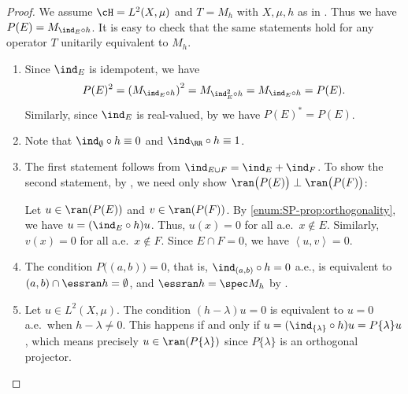 \documentclass[oneside,reqno,letterpaper]{amsart}
\begin{document}
\begin{proof}
  We assume \(\cH = L^2(X, \mu)\) and \(T = M_h\) with \(X, \mu, h\) as in . 
  Thus we have \(P(E) = M_{\ind_{E} \circ h}\). 
  It is easy to check that the same statements hold for any operator \(T\) unitarily equivalent to \(M_{h}\). 
  \begin{enumerate}[label=(\alph*)]
  \item %
    Since \(\ind_{E}\) is idempotent, we have 
    \[
      P(E)^2
      = \left( M_{\ind_{E} \circ h} \right)^2
      = M_{\ind_{E}^2 \circ h}
      = M_{\ind_{E} \circ h}
      = P(E) . 
    \] 
    Similarly, since \(\ind_{E}\) is real-valued, by  we have \(P(E)^* = P(E)\). 

  \item %
    Note that \(\ind_{\emptyset} \circ h \equiv 0\) and \(\ind_{\RR} \circ h \equiv 1\). 

  \item %
    The first statement follows from \(\ind_{E \cup F} = \ind_{E} + \ind_{F}\). 
    To show the second statement, by , we need only show \(\ran\big(P(E)\big) \perp \ran\big(P(F)\big)\):

    Let \(u \in \ran(P(E))\) and \(v \in \ran(P(F))\). 
    By \ref{enum:SP-prop:orthogonality}, we have \(u = (\ind_{E} \circ h) u\). 
    Thus, \(u(x) = 0\) for all  a.e.\ \(x \not\in E\). 
    Similarly, \(v(x) = 0\) for all a.e.\ \(x \not\in F\). 
    Since \(E \cap F = 0\), we have  \(\left< u, v \right> = 0\). 

  \item %
    The condition \(P\big((a, b)\big) = 0\), that is, \(\ind_{(a, b)} \circ h = 0\) a.e., is equivalent to \((a, b) \cap \essran h = \emptyset\), and \(\essran h = \spec M_{h}\) by . 

  \item %
    Let \(u \in L^2(X, \mu)\). 
    The condition \((h - \lambda) u = 0\) is equivalent to \(u = 0\) a.e.\ when \(h - \lambda \neq 0\). 
    This happens if and only if \(u = (\ind_{\{\lambda\}} \circ h) u = P\{\lambda\} u\), which means precisely \(u \in \ran(P \{\lambda\})\) since \(P \{\lambda\}\) is an orthogonal projector. 
  \end{enumerate}
\end{proof}
\end{document}
